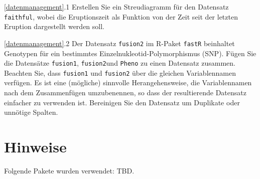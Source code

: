 \documentclass[
  ngerman,
]{scrbook}
\begin{document}
\ref{datenmanagement}.1 Erstellen Sie ein Streudiagramm für den Datensatz \texttt{faithful}, wobei die Eruptionszeit als Funktion von der Zeit seit der letzten Eruption dargestellt werden soll.

\ref{datenmanagement}.2 Der Datensatz \texttt{fusion2} im \textsf{R}-Paket \texttt{fastR} beinhaltet Genotypen für ein bestimmtes Einzelnukleotid-Polymorphismus (\textsc{SNP}). Fügen Sie die Datensätze \texttt{fusion1}, \texttt{fusion2}und \texttt{Pheno} zu einen Datensatz zusammen. Beachten Sie, dass \texttt{fusion1} und \texttt{fusion2} über die gleichen Variablennamen verfügen. Es ist eine (mögliche) sinnvolle Herangehensweise, die Variablennamen nach dem Zusammenfügen umzubenennen, so dass der resultierende Datensatz einfacher zu verwenden ist. Bereinigen Sie den Datensatz um Duplikate oder unnötige Spalten.

\hypertarget{hinweise}{%
\chapter{Hinweise}\label{hinweise}}

Folgende Pakete wurden verwendet: TBD.

\printbibliography
\end{document}
